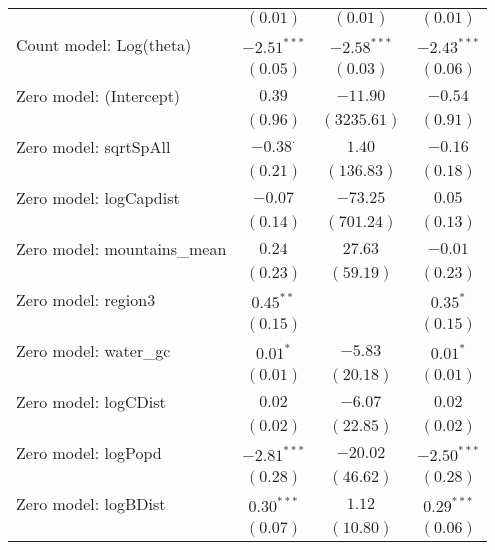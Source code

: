 \begin{table}
\begin{center}
{\begin{tabular}{l c c c}
                                  & $(0.01)$        & $(0.01)$      & $(0.01)$      \\
Count model: Log(theta)           & $-2.51^{***}$   & $-2.58^{***}$ & $-2.43^{***}$ \\
                                  & $(0.05)$        & $(0.03)$      & $(0.06)$      \\
Zero model: (Intercept)           & $0.39$          & $-11.90$      & $-0.54$       \\
                                  & $(0.96)$        & $(3235.61)$   & $(0.91)$      \\
Zero model: sqrtSpAll             & $-0.38^{\cdot}$ & $1.40$        & $-0.16$       \\
                                  & $(0.21)$        & $(136.83)$    & $(0.18)$      \\
Zero model: logCapdist            & $-0.07$         & $-73.25$      & $0.05$        \\
                                  & $(0.14)$        & $(701.24)$    & $(0.13)$      \\
Zero model: mountains\_mean       & $0.24$          & $27.63$       & $-0.01$       \\
                                  & $(0.23)$        & $(59.19)$     & $(0.23)$      \\
Zero model: region3               & $0.45^{**}$     &               & $0.35^{*}$    \\
                                  & $(0.15)$        &               & $(0.15)$      \\
Zero model: water\_gc             & $0.01^{*}$      & $-5.83$       & $0.01^{*}$    \\
                                  & $(0.01)$        & $(20.18)$     & $(0.01)$      \\
Zero model: logCDist              & $0.02$          & $-6.07$       & $0.02$        \\
                                  & $(0.02)$        & $(22.85)$     & $(0.02)$      \\
Zero model: logPopd               & $-2.81^{***}$   & $-20.02$      & $-2.50^{***}$ \\
                                  & $(0.28)$        & $(46.62)$     & $(0.28)$      \\
Zero model: logBDist              & $0.30^{***}$    & $1.12$        & $0.29^{***}$  \\
                                  & $(0.07)$        & $(10.80)$     & $(0.06)$      \\

\end{tabular}}
\end{center}
\end{table}
